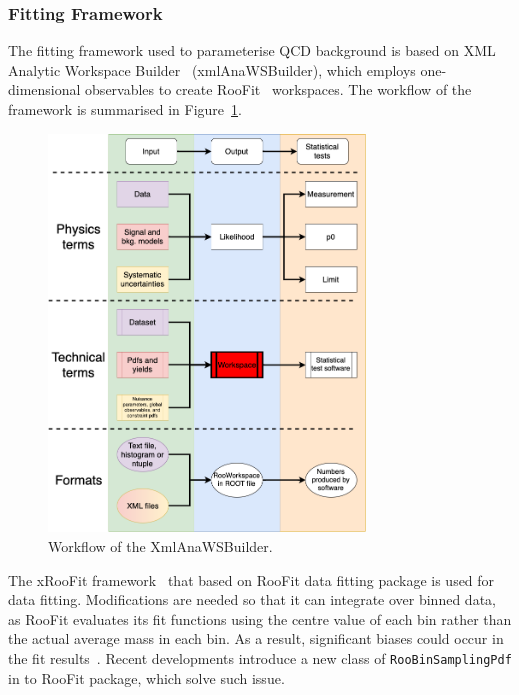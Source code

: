 \label{sec:statistical_framework}

\subsubsection{Fitting Framework}

The fitting framework used to parameterise QCD background is based on XML Analytic Workspace Builder~\cite{xmlAnaWSBuilder} (xmlAnaWSBuilder), which employs one-dimensional 
observables to create RooFit~\cite{RooFit} workspaces. The workflow of the framework is summarised in Figure~\ref{fig:xmlAnaWSBuilderworkflow}.

\begin{figure}[htb]
 \centering
\includegraphics[width=0.75\textwidth]{fig/06-StatisticalFramework/xmlAnaWSBuilder_workflow}
\caption{Workflow of the XmlAnaWSBuilder.  \label{fig:xmlAnaWSBuilderworkflow}}
\end{figure}

The xRooFit framework~\cite{xRooFit} that based on RooFit data fitting package is used for data fitting. Modifications are needed so that it can integrate over binned data, as RooFit evaluates its fit functions using the centre value of each bin rather than the actual average mass in each bin. As a result, significant biases could occur in the fit results~\cite{gligorov2021avoiding}. Recent developments introduce a new class of \texttt{RooBinSamplingPdf} in to RooFit package, which solve such issue.

